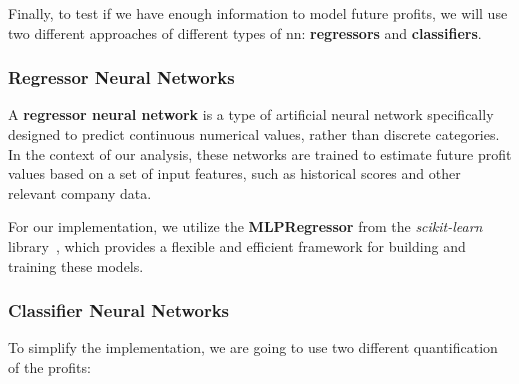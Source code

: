 \documentclass[11pt,english,a4paper,hidelinks]{book}
\begin{document}
\noindent Finally, to test if we have enough information to model future profits, we will use two different approaches of different types of \acrshort{nn}: \textbf{regressors} and \textbf{classifiers}.

\subsubsection{Regressor Neural Networks}

\noindent
A \textbf{regressor neural network} is a type of artificial neural network specifically designed to predict continuous numerical values, rather than discrete categories. In the context of our analysis, these networks are trained to estimate future profit values based on a set of input features, such as historical scores and other relevant company data.

\vspace{0.5cm}
\noindent For our implementation, we utilize the \textbf{MLPRegressor} from the \textit{scikit-learn} library~\cite{scikit2025mlpregressor}, which provides a flexible and efficient framework for building and training these models.

\subsubsection{Classifier Neural Networks}

\noindent To simplify the implementation, we are going to use two different quantification of the profits:
\end{document}
